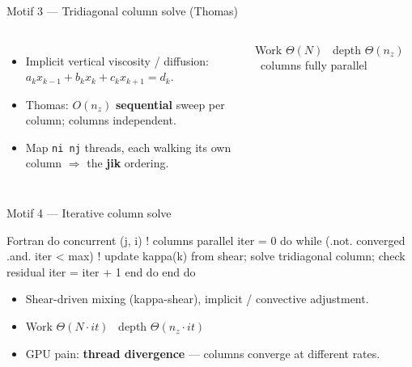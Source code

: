 \documentclass[aspectratio=169]{beamer}
\newcommand{\cplx}[1]{{\footnotesize\color{cookieMuted}#1}}
\begin{document}
\begin{frame}[fragile]{Motif 3 --- Tridiagonal column solve (Thomas)}
  \begin{columns}[c,onlytextwidth]
      \centering
      \begin{itemize}
        \item Implicit vertical viscosity / diffusion: $a_k x_{k-1}+b_k x_k+c_k x_{k+1}=d_k$.
        \item Thomas: $O(n_z)$ \textbf{sequential} sweep per column; columns independent.
        \item Map \texttt{ni\,nj} threads, each walking its own column $\Rightarrow$ the \textbf{jik} ordering.
      \end{itemize}
      \vspace{.3em}
      \cplx{Work $\Theta(N)$ \textperiodcentered\ depth $\Theta(n_z)$ \textperiodcentered\ columns fully parallel}
  \end{columns}
\end{frame}

\begin{frame}[fragile]{Motif 4 --- Iterative column solve}
  \begin{cookiecode}[title=data-dependent iteration count]{Fortran}
do concurrent (j, i)             ! columns parallel
  iter = 0
  do while (.not. converged .and. iter < max)
    ! update kappa(k) from shear; solve tridiagonal column; check residual
    iter = iter + 1
  end do
end do
  \end{cookiecode}
  \begin{itemize}
    \item Shear-driven mixing (kappa-shear), implicit / convective adjustment.
    \item \cplx{Work $\Theta(N\cdot it)$ \textperiodcentered\ depth $\Theta(n_z\cdot it)$}
    \item GPU pain: \textbf{thread divergence} --- columns converge at different rates.
  \end{itemize}
\end{frame}
\end{document}
